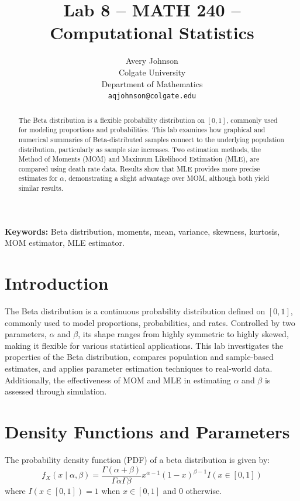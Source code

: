 \documentclass{article}\usepackage[]{graphicx}\usepackage[]{xcolor}
\begin{document}
\vspace{-1in}
\title{Lab 8 -- MATH 240 -- Computational Statistics}

\author{
  Avery Johnson \\
  Colgate University  \\
  Department of Mathematics  \\
  {\tt aqjohnson@colgate.edu}
}

\date{}

\maketitle

\begin{multicols}{2}
\begin{abstract}
The Beta distribution is a flexible probability distribution on $[0,1]$, commonly used for modeling proportions and probabilities. This lab examines how graphical and numerical summaries of Beta-distributed samples connect to the underlying population distribution, particularly as sample size increases. Two estimation methods, the Method of Moments (MOM) and Maximum Likelihood Estimation (MLE), are compared using death rate data. Results show that MLE provides more precise estimates for $\alpha$, demonstrating a slight advantage over MOM, although both yield similar results. 

\end{abstract}

\noindent \textbf{Keywords:} 
Beta distribution, moments, mean, variance, skewness, kurtosis, MOM estimator, MLE estimator.

\section{Introduction}
The Beta distribution is a continuous probability distribution defined on $[0,1]$, commonly used to model proportions, probabilities, and rates. Controlled by two parameters, $\alpha$ and $\beta$, its shape ranges from highly symmetric to highly skewed, making it flexible for various statistical applications. This lab investigates the properties of the Beta distribution, compares population and sample-based estimates, and applies parameter estimation techniques to real-world data. Additionally, the effectiveness of MOM and MLE in estimating $\alpha$ and $\beta$ is assessed through simulation.

\section{Density Functions and Parameters}
The probability density function (PDF) of a beta distribution is given by:
$$
f_X(x \mid \alpha, \beta) = \frac{\Gamma(\alpha + \beta)}{\Gamma \alpha \Gamma \beta} x^{\alpha-1} (1-x)^{\beta - 1} I(x \in [0,1])
$$
where $I(x \in [0,1]) = 1$ when $x \in [0, 1]$ and $0$ otherwise.


\end{multicols}
\end{document}
